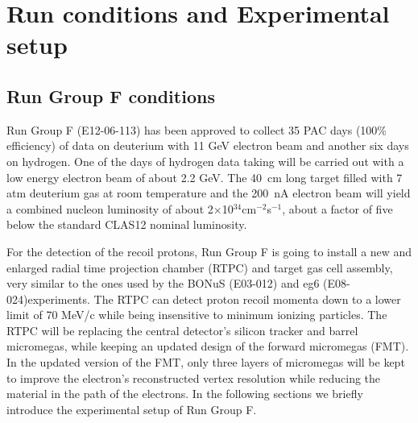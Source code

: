 \chapter{Run conditions and Experimental setup}
\label{chap:physics}

\section{Run Group F conditions}

Run Group F (E12-06-113) has been approved to collect 35 PAC days (100\% 
efficiency) of data on deuterium with 11 GeV electron beam and another six days 
on hydrogen. One of the days of hydrogen data taking will be carried out with a 
low energy electron beam of about 2.2 GeV. The 40~cm long target filled with 7 
atm deuterium gas at room temperature and the 200~nA electron beam will yield a 
combined nucleon luminosity of about 2$\times$10$^{34}$cm$^{-2}$s$^{-1}$, about 
a factor of five below the standard CLAS12 nominal luminosity.

For the detection of the recoil protons, Run Group F is going to install a new 
and enlarged radial time projection chamber (RTPC) and target gas cell 
assembly, very similar to the ones used by the BONuS (E03-012) and eg6 
(E08-024)experiments. The RTPC can detect proton recoil momenta down to a lower 
limit of 70 MeV/c while being insensitive to minimum ionizing particles. The 
RTPC will be replacing the central detector's silicon tracker
and barrel micromegas, while keeping an updated design of the forward 
micromegas (FMT). In the updated version of the FMT, only three layers of 
micromegas will be kept to improve the electron's reconstructed vertex 
resolution while reducing the material in the path of the electrons. In the 
following sections we briefly introduce the experimental setup of Run Group F. 


